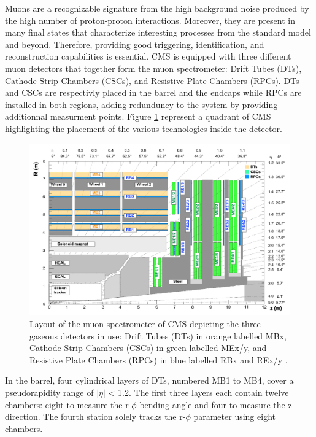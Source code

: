     Muons are a recognizable signature from the high background noise produced by the high number of proton-proton interactions. Moreover, they are present in many final states that characterize interesting processes from the standard model and beyond. Therefore, providing good triggering, identification, and reconstruction capabilities is essential. CMS is equipped with three different muon detectors that together form the muon spectrometer: Drift Tubes (DTs), Cathode Strip Chambers (CSCs), and Resistive Plate Chambers (RPCs). DTs and CSCs are respectivly placed in the barrel and the endcaps while RPCs are installed in both regions, adding redunduncy to the system by providing additionnal measurment points. Figure \ref{fig:I-3-muons} represent a quadrant of CMS highlighting the placement of the various technologies inside the detector. \\

    \begin{figure}[h!]
      \centering
      \includegraphics[width=\textwidth]{img/I-3-cms/muons.pdf}
      \caption{Layout of the muon spectrometer of CMS depicting the three gaseous detectors in use: Drift Tubes (DTs) in orange labelled MBx, Cathode Strip Chambers (CSCs) in green labelled MEx/y, and Resistive Plate Chambers (RPCs) in blue labelled RBx and REx/y \cite{1748-0221-3-08-S08004}.}
      \label{fig:I-3-muons}
    \end{figure}

    In the barrel, four cylindrical layers of DTs, numbered MB1 to MB4, cover a pseudorapidity range of $ | \eta | $ < 1.2. The first three layers each contain twelve chambers: eight to measure the r-$\phi$ bending angle and four to measure the z direction. The fourth station solely tracks the r-$\phi$ parameter using eight chambers. \\

